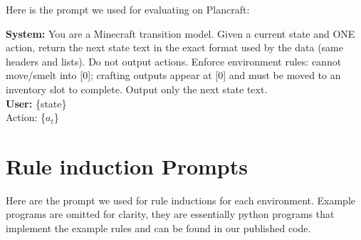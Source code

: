 \documentclass{article}
\theoremstyle{plain}
\theoremstyle{definition}
\theoremstyle{remark}
\begin{document}
Here is the prompt we used for evaluating on Plancraft:
\begin{tcolorbox}[
  title=Prompt used for Evaluating on Plancraft,
  colback=gray!5,
  colframe=black!50,
  fonttitle=\bfseries
]
\textbf{System:} You are a Minecraft transition model. Given a current state and ONE action, return the next state text in the exact format used by the data (same headers and lists). Do not output actions. Enforce environment rules: cannot move/smelt into [0]; crafting outputs appear at [0] and must be moved to an inventory slot to complete. Output only the next state text. \\[0.5em]
\textbf{User:} \{state\} \\
Action: \{$a_t$\}
\end{tcolorbox}

\section{Rule induction Prompts}\label{app:prompt_rule_induction}
Here are the prompt we used for rule inductions for each environment. Example programs are omitted for clarity, they are essentially python programs that implement the example rules and can be found in our published code.
\end{document}
